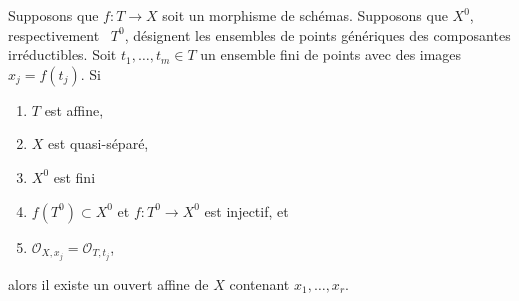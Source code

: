 \begin{lemma}
\label{lemma-points-in-affine}
Supposons que $f : T \to X$ soit un morphisme de schémas. Supposons
que $X^0$, respectivement \ $T^0$, désignent les ensembles de
points génériques des composantes irréductibles. Soit $t_1, \ldots,
t_m \in T$ un ensemble fini de points avec des images $x_j = f(t_j)$. Si
\begin{enumerate}
\item $T$ est affine, \item $X$ est
quasi-séparé, \item $X^0$ est fini
\item $f(T^0) \subset X^0$ et $f : T^0
\to X^0$ est injectif, et \item
$\mathcal{O}_{X, x_j} = \mathcal{O}_{T, t_j}$,
\end{enumerate}
alors il existe un ouvert affine de $X$ contenant $x_1, \ldots, x_r$.
\end{lemma}

